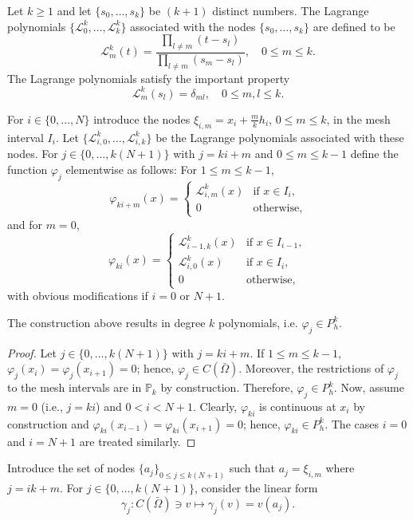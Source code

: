 \begin{definition}\label{def:lagrangepolynomials}
    Let $k \ge 1$ and let $\{s_0, \dots, s_k\}$ be $(k+1)$ distinct numbers. The Lagrange polynomials $\{\mathcal{L}_0^k, \dots, \mathcal{L}_k^k\}$ associated with the nodes $\{s_0, \dots, s_k\}$ are defined to be
    \begin{equation*}
\mathcal{L}_m^k(t) = \frac{\prod_{l \ne m}(t - s_l)}{\prod_{l \ne m}(s_m - s_l)}, \quad 0 \le m \le k.
\end{equation*}
    The Lagrange polynomials satisfy the important property
    \begin{equation*}
\mathcal{L}_m^k(s_l) = \delta_{ml}, \quad 0 \le m,l \le k.
\end{equation*}
\end{definition}
For $i \in \{0, \dots, N\}$ introduce the nodes $\xi_{i,m} = x_i + \frac{m}{k}h_i$, $0 \le m \le k$, in the mesh interval $I_i$. Let $\{\mathcal{L}_{i,0}^k, \dots, \mathcal{L}_{i,k}^k\}$ be the Lagrange polynomials associated with these nodes. For $j \in \{0, \dots, k(N+1)\}$ with $j = ki + m$ and $0 \le m \le k-1$ define the function $\varphi_j$ elementwise as follows: For $1 \le m \le k-1$,
\begin{equation*}
\varphi_{ki+m}(x) = \begin{cases} \mathcal{L}_{i,m}^k(x) & \text{if } x \in I_i, \\ 0 & \text{otherwise}, \end{cases}
\end{equation*}
and for $m=0$,
\begin{equation*}
\varphi_{ki}(x) = \begin{cases} \mathcal{L}_{i-1,k}^k(x) & \text{if } x \in I_{i-1}, \\ \mathcal{L}_{i,0}^k(x) & \text{if } x \in I_i, \\ 0 & \text{otherwise}, \end{cases}
\end{equation*}
with obvious modifications if $i = 0$ or $N+1$.
\begin{lemma}\label{basis_functions_Pk}
    The construction above results in degree $k$ polynomials, i.e. $\varphi_j \in P_h^k$.
\begin{proof}
    Let $j \in \{0, \dots, k(N+1)\}$ with $j = ki + m.$ If $1 \le m \le k-1$, $\varphi_j(x_i) = \varphi_j(x_{i+1}) = 0$; hence, $\varphi_j \in C(\bar{\Omega})$. Moreover, the restrictions of $\varphi_j$ to the mesh intervals are in $\mathbb{P}_k$ by construction. Therefore, $\varphi_j \in P_h^k$. Now, assume $m = 0$ (i.e., $j=ki$) and $0 < i < N+1$. Clearly, $\varphi_{ki}$ is continuous at $x_i$ by construction and $\varphi_{ki}(x_{i-1}) = \varphi_{ki}(x_{i+1}) = 0$; hence, $\varphi_{ki} \in P_h^k$. The cases $i = 0$ and $i = N+1$ are treated similarly.
\end{proof}
\end{lemma}
Introduce the set of nodes $\{a_j\}_{0 \le j \le k(N+1)}$ such that $a_j = \xi_{i,m}$ where $j = ik + m$. For $j \in \{0, \dots, k(N+1)\}$, consider the linear form
\begin{equation*}
\gamma_j: C(\bar{\Omega}) \ni v \mapsto \gamma_j(v) = v(a_j).
\end{equation*}

